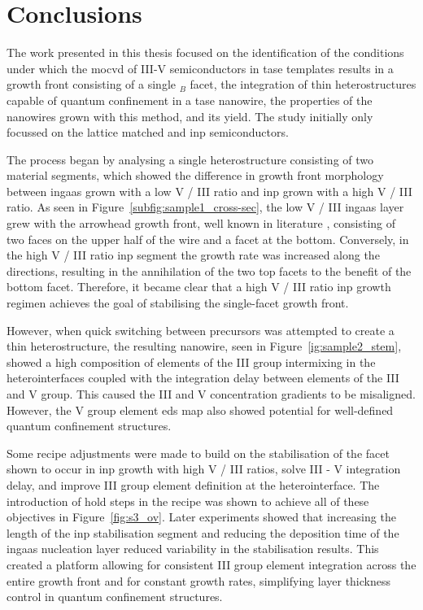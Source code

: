 \chapter{Conclusions}
\label{chap:conclusions}

The work presented in this thesis focused on the identification of the conditions under which the \acf{mocvd} of III-V semiconductors in \acf{tase} templates results in a growth front consisting of a single \(_B\) facet, the integration of thin heterostructures capable of quantum confinement in a \acs{tase} nanowire, the properties of the nanowires grown with this method, and its yield. The study initially only focussed on the lattice matched  and \acs{inp} semiconductors.

The process began by analysing a single heterostructure consisting of two material segments, which showed the difference in growth front morphology between \acf{ingaas} grown with a low V / III ratio and \acf{inp} grown with a high V / III ratio. As seen in Figure~\ref{subfig:sample1_cross-sec}, the low V / III \acs{ingaas} layer grew with the arrowhead growth front, well known in literature \cite{Knoedler2017}, consisting of two  faces on the upper half of the wire and a  facet at the bottom. Conversely, in the high V / III ratio \acs{inp} segment the growth rate was increased along the  directions, resulting in the annihilation of the two top  facets to the benefit of the bottom  facet. Therefore, it became clear that a high V / III ratio \acs{inp} growth regimen achieves the goal of stabilising the single-facet growth front.

However, when quick switching between precursors was attempted to create a thin heterostructure, the resulting nanowire, seen in Figure~\ref{ig:sample2_stem}, showed a high composition of elements of the III group intermixing in the heterointerfaces coupled with the integration delay between elements of the III and V group. This caused the III and V concentration gradients to be misaligned. However, the V group element \acf{eds} map also showed potential for well-defined quantum confinement structures.

Some recipe adjustments were made to build on the stabilisation of the  facet shown to occur in \acs{inp} growth with high V / III ratios, solve III - V integration delay, and improve III group element definition at the heterointerface. The introduction of hold steps in the recipe was shown to achieve all of these objectives in Figure~\ref{fig:s3_ov}. Later experiments showed that increasing the length of the \acs{inp} stabilisation segment and reducing the deposition time of the \acs{ingaas} nucleation layer reduced variability in the stabilisation results. This created a platform allowing for consistent III group element integration across the entire growth front and for constant growth rates, simplifying layer thickness control in quantum confinement structures.

